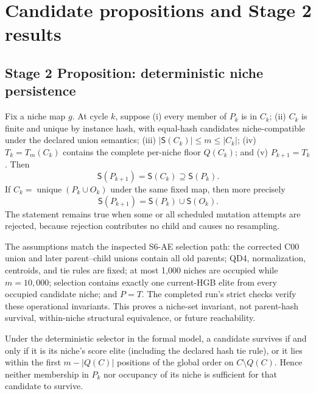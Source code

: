 \section{Candidate propositions and Stage 2 results}

\subsection{Stage 2 Proposition: deterministic niche persistence}
  

\begin{proposition}
\label{prop:niche-persistence}
Fix a niche map $g$. At cycle $k$, suppose (i) every member of $P_k$ is in
$C_k$; (ii) $C_k$ is finite and unique by instance hash, with equal-hash
candidates niche-compatible under the declared union semantics; (iii)
$|\mathsf S(C_k)|\leq m\leq|C_k|$; (iv) $T_k=T_m(C_k)$ contains the complete
per-niche floor $Q(C_k)$; and (v) $P_{k+1}=T_k$. Then
\[
 \mathsf S(P_{k+1})=\mathsf S(C_k)\supseteq\mathsf S(P_k).
\]
If $C_k=\operatorname{unique}(P_k\cup O_k)$ under the same fixed map, then
more precisely
\[
 \mathsf S(P_{k+1})=
 \mathsf S(P_k)\cup\mathsf S(O_k).
\]
The statement remains true when some or all scheduled mutation attempts are
rejected, because rejection contributes no child and causes no resampling.
\end{proposition}

The assumptions match the inspected S6-AE selection path: the corrected C00
union and later parent--child unions contain all old parents; QD4,
normalization, centroids, and tie rules are fixed; at most 1,000 niches are
occupied while $m=10{,}000$; selection contains exactly one current-HGB elite
from every occupied candidate niche; and $P=T$. The completed run's strict
checks verify these operational invariants. This proves a niche-set invariant,
not parent-hash survival, within-niche structural equivalence, or future
reachability.

\begin{lemma}
\label{lem:membership}
Under the deterministic selector in the formal model, a candidate survives
if and only if it is its niche's score elite (including the declared hash tie
rule), or it lies within the first $m-|Q(C)|$ positions of the global order on
$C\setminus Q(C)$. Hence neither membership in $P_k$ nor occupancy of its
niche is sufficient for that candidate to survive.
\end{lemma}


